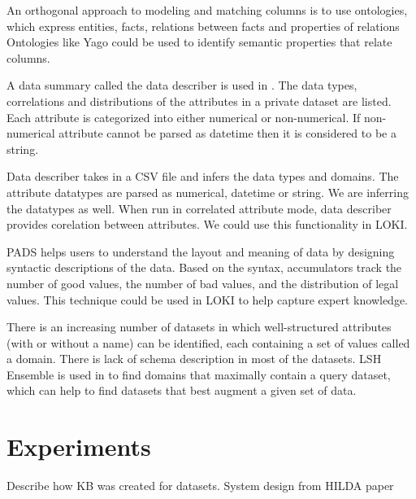 \documentclass{vldb}
\begin{document}
An orthogonal approach to modeling and matching columns is to use ontologies, which express entities, facts, relations between facts and properties of relations
Ontologies like Yago \cite{fabian2007yago} could be used to identify semantic properties that relate columns.

A data summary called the data describer is used in \cite{ping2017datasynthesizer}. The data types, correlations and distributions of the attributes in a private dataset are listed. Each attribute is categorized into either numerical or non-numerical. If non-numerical attribute cannot be parsed as datetime then it is considered to be a string.

Data describer takes in a CSV file and infers the data types and domains. The attribute datatypes are parsed as numerical, datetime or string. We are inferring the datatypes as well. When run in correlated attribute mode, data describer provides corelation between attributes. We could use this functionality in LOKI.

PADS \cite{fisher2005pads} helps users to understand the layout and meaning of data by designing syntactic descriptions of the data.
Based on the syntax, accumulators track the number of good values, the number of bad values, and the distribution of legal values.
This technique could be used in LOKI to help capture expert knowledge.

There is an increasing number of datasets in which well-structured attributes
(with or without a name) can be identified, each containing a set of values called a domain. There is lack of schema description in most of the datasets.
LSH Ensemble is used in \cite{zhu2016lsh} to find domains that maximally contain a query dataset, which can help to find datasets that best augment a given set of data.

\section{Experiments}
Describe how KB was created for datasets. System design from HILDA paper
\end{document}
